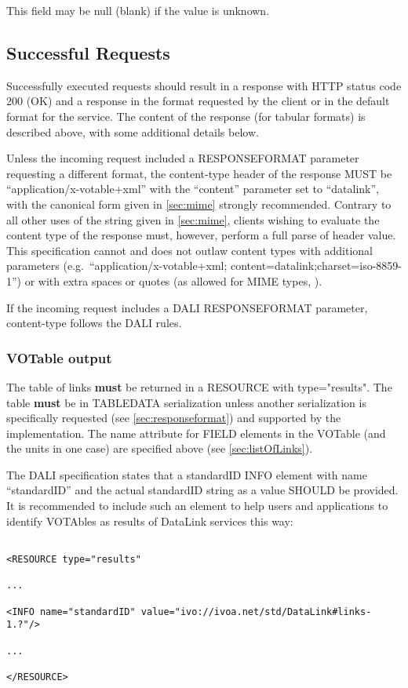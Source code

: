 \documentclass[11pt,a4paper]{ivoa}
\newcommand{\attval}[2]{#1={\allowbreak}{"}#2{"}}
\begin{document}
This field may be null (blank) if the value is unknown.

\subsection{Successful Requests}
\label{sec:successfulRequests}

Successfully executed requests should result in a response with HTTP
status code 200 (OK) and a response in the format requested by the client
or in the default format for the service. The content of the response
(for tabular formats) is described above,
with some additional details below.

Unless the incoming request included a RESPONSEFORMAT parameter requesting
a different format, the content-type header of the response MUST be
``application/x-votable+xml'' with the
``content'' parameter set to ``datalink'',
with the canonical form given in \ref{sec:mime}
strongly recommended. Contrary to
all other uses of the string given in \ref{sec:mime},
clients wishing to evaluate
the content type of the response must, however, perform a full parse
of header value. This specification cannot and does not outlaw content
types with additional parameters
(e.g.\ ``application/x-votable+xml; content=datalink;charset=iso-8859-1'')
or with extra spaces or quotes
(as allowed for MIME types, \citet{std:RFC2045}).

If the incoming request includes a DALI RESPONSEFORMAT parameter,
content-type follows the DALI rules.


\subsubsection{VOTable output}

The table of links {\bf must} be returned in a RESOURCE with
\attval{type}{results}. The table {\bf must} be in TABLEDATA serialization
unless another serialization is specifically requested
(see \ref{sec:responseformat})
and supported by the implementation.
The name attribute for FIELD elements in the VOTable
(and the units in one case) are specified above (see \ref{sec:listOfLinks}).

The DALI specification states that a standardID INFO element   with
name ``standardID'' and the actual standardID string as a value SHOULD
be provided.  It is recommended to include such an element to help users
and applications to identify VOTAbles as results of DataLink services
this way:
\begin{verbatim}

<RESOURCE type="results" 

... 

<INFO name="standardID" value="ivo://ivoa.net/std/DataLink#links-1.?"/> 

... 

</RESOURCE>
\end{verbatim}
\end{document}
